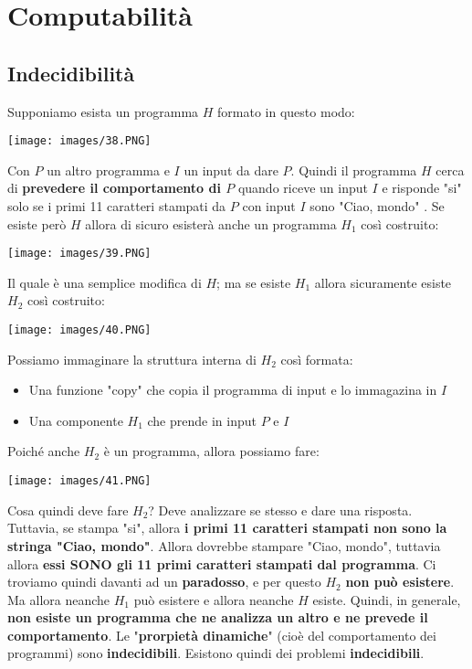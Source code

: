 \documentclass[12pt]{article}
\begin{document}
\section{Computabilità}
\subsection{Indecidibilità}
Supponiamo esista un programma $H$ formato in questo modo:
\begin{center}
    \hspace{-2,9cm}
    \texttt{[image: images/38.PNG]}
\end{center}
Con $P$ un altro programma e $I$ un input da dare $P$. Quindi il programma $H$ cerca di \textbf{prevedere il comportamento di $P$} quando riceve un input $I$ e risponde "si" solo se i primi 11 caratteri stampati da $P$ con input $I$ sono "Ciao, mondo" . Se esiste però $H$ allora di sicuro esisterà anche un programma $H_1$ così costruito:
\begin{center}
    \texttt{[image: images/39.PNG]}
\end{center}
Il quale è una semplice modifica di $H$; ma se esiste $H_1$ allora sicuramente esiste $H_2$ così costruito:
\begin{center}
    \texttt{[image: images/40.PNG]}
\end{center}
Possiamo immaginare la struttura interna di $H_2$ così formata:
\begin{itemize}
    \item Una funzione "copy" che copia il programma di input e lo immagazina in $I$
    \item Una componente $H_1$ che prende in input $P$ e $I$
\end{itemize}
Poiché anche $H_2$ è un programma, allora possiamo fare:
\begin{center}
    \texttt{[image: images/41.PNG]}
\end{center}
Cosa quindi deve fare $H_2$? Deve analizzare se stesso e dare una risposta. Tuttavia, se stampa "si", allora \textbf{i primi 11 caratteri stampati non sono la stringa "Ciao, mondo"}. Allora dovrebbe stampare "Ciao, mondo", tuttavia allora \textbf{essi SONO gli 11 primi caratteri stampati dal programma}. Ci troviamo quindi davanti ad un \textbf{paradosso}, e per questo $H_2$ \textbf{non può esistere}. Ma allora neanche $H_1$ può esistere e allora neanche $H$ esiste.\newline
Quindi, in generale, \textbf{non esiste un programma che ne analizza un altro e ne prevede il comportamento}. Le "\textbf{prorpietà dinamiche}" (cioè del comportamento dei programmi) sono \textbf{indecidibili}. Esistono quindi dei problemi \textbf{indecidibili}.
\end{document}
